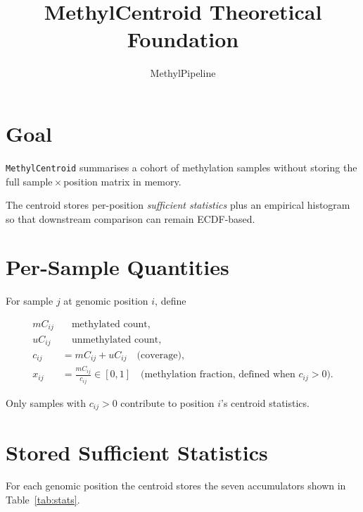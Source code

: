 \documentclass[11pt]{article}
\title{MethylCentroid Theoretical Foundation}
\author{MethylPipeline}
\date{}
\begin{document}
\maketitle
\tableofcontents
\newpage

\section{Goal}

\texttt{MethylCentroid} summarises a cohort of methylation samples
without storing the full sample\,\(\times\)\,position matrix in memory. 

The centroid stores per-position \emph{sufficient statistics} plus an
empirical histogram so that downstream comparison can remain ECDF-based.

\section{Per-Sample Quantities}

For sample \(j\) at genomic position \(i\), define

\begin{align}
  mC_{ij} &\quad \text{methylated count,} \\
  uC_{ij} &\quad \text{unmethylated count,} \\
  c_{ij}  &= mC_{ij} + uC_{ij} \quad \text{(coverage),} \\
  x_{ij}  &= \frac{mC_{ij}}{c_{ij}} \in [0,1]
             \quad \text{(methylation fraction, defined when } c_{ij}>0\text{).}
\end{align}

Only samples with \(c_{ij}>0\) contribute to position \(i\)'s centroid
statistics.

\section{Stored Sufficient Statistics}

For each genomic position the centroid stores the seven accumulators shown
in Table~\ref{tab:stats}.
\end{document}
